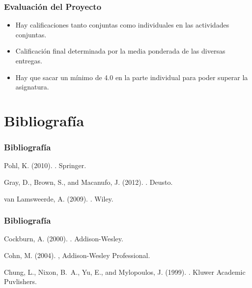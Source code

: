 \documentclass[a4paper,slidestop,xcolor=pst,dvips,blue]{beamer}
\begin{document}
\begin{frame}[c]
	\frametitle{Evaluación del Proyecto}
	\begin{itemize}[<+->]
        \item Hay calificaciones tanto conjuntas como individuales en las actividades conjuntas.
        \item Calificación final determinada por la media ponderada de las diversas entregas.
        \item Hay que sacar un mínimo de 4.0 en la parte individual para poder superar la asignatura. 
	\end{itemize}
\end{frame}

\section{Bibliografía}

\begin{frame}[c]
	\frametitle{Bibliografía}
\begin{thebibliography}{}

Pohl, K. (2010).
.
\newblock Springer.

Gray, D., Brown, S., and Macanufo, J. (2012).
.
\newblock Deusto.

van Lamsweerde, A. (2009).
.
\newblock Wiley.

\end{thebibliography}
\end{frame}

\begin{frame}[c]
	\frametitle{Bibliografía}
\begin{thebibliography}{}

Cockburn, A. (2000).
.
\newblock Addison-Wesley.

Cohn, M. (2004).
,
\newblock Addison-Wesley Professional.

Chung, L., Nixon, B.~A., Yu, E., and Mylopoulos, J. (1999).
.
\newblock Kluwer Academic Puvlishers.

\end{thebibliography}

\end{frame}
\end{document}
